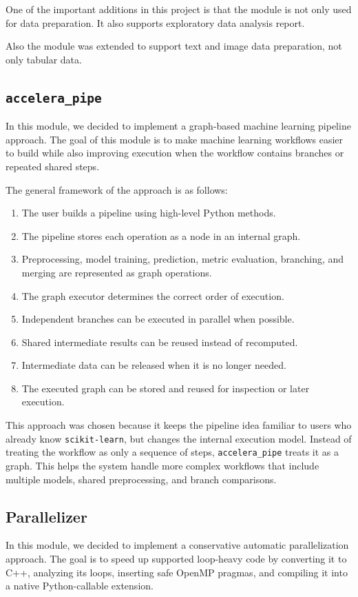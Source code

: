 \documentclass[12pt,a4paper]{report}
\begin{document}
\noindent One of the important additions in this project is that the module is not
only used for data preparation. It also supports exploratory data analysis report.

\noindent Also the module was extended to support text and image data
preparation, not only tabular data.

\subsection{\texttt{accelera\_pipe}}
In this module, we decided to implement a graph-based machine learning pipeline
approach. The goal of this module is to make machine learning workflows easier
to build while also improving execution when the workflow contains branches or
repeated shared steps.

The general framework of the approach is as follows:
\begin{enumerate}
  \item The user builds a pipeline using high-level Python methods.
  \item The pipeline stores each operation as a node in an internal graph.
  \item Preprocessing, model training, prediction, metric evaluation, branching,
  and merging are represented as graph operations.
  \item The graph executor determines the correct order of execution.
  \item Independent branches can be executed in parallel when possible.
  \item Shared intermediate results can be reused instead of recomputed.
  \item Intermediate data can be released when it is no longer needed.
  \item The executed graph can be stored and reused for inspection or later execution.
\end{enumerate}

\noindent This approach was chosen because it keeps the pipeline idea familiar to
users who already know \texttt{scikit-learn}, but changes the internal execution
model. Instead of treating the workflow as only a sequence of steps,
\texttt{accelera\_pipe} treats it as a graph. This helps the system handle more
complex workflows that include multiple models, shared preprocessing, and branch
comparisons.

\subsection{Parallelizer}
In this module, we decided to implement a conservative automatic parallelization
approach. The goal is to speed up supported loop-heavy code by converting it to
C++, analyzing its loops, inserting safe OpenMP pragmas, and compiling it into a
native Python-callable extension.
\end{document}
